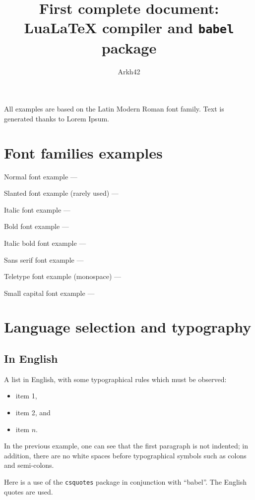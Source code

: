 \documentclass[11pt, a4paper, english]{article}
\author{Arkh42}
\title{First complete document: Lua\LaTeX{} compiler and \texttt{babel} package}
\begin{document}
	
	
	\maketitle
	
	
	All examples are based on the Latin Modern Roman font family.
	Text is generated thanks to Lorem Ipsum.
	
	
	\section{Font families examples}
	
		Normal font example --- \lipsum[1]
		
		Slanted font example (rarely used) --- \textsl{\lipsum[1]}
		
		Italic font example --- \textit{\lipsum[1]}
		
		Bold font example --- \textbf{\lipsum[1]}
		
		Italic bold font example --- \textbf{\textit{\lipsum[1]}}
		
		Sans serif font example --- \textsf{\lipsum[1]}
		
		Teletype font example (monospace) --- \texttt{\lipsum[1]}
		
		Small capital font example --- \textsc{\lipsum[1]}
	
	
	\section{Language selection and typography}
	
	
		\subsection{In English}
		
			A list in English, with some typographical rules which must be observed:
			\begin{itemize}
				\item item 1,
				\item item 2, and
				\item item $n$.
			\end{itemize}
			
			In the previous example, one can see that the first paragraph is not indented; in addition, there are no white spaces before typographical symbols such as colons and semi-colons.
			
			Here is a use of the \texttt{csquotes} package in conjunction with \enquote{babel}. The English quotes are used. 
	
\end{document}
